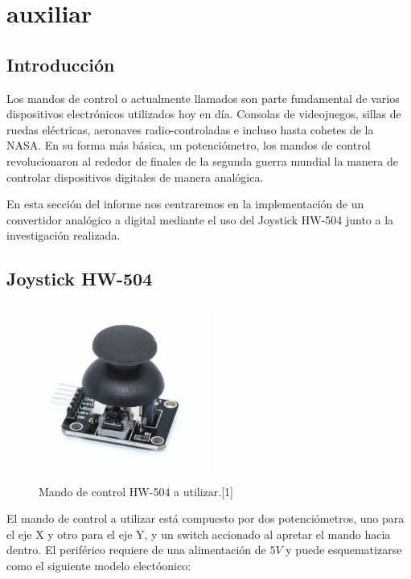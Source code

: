 

\section{auxiliar}
\tableofcontents

\subsection{Introducción}

Los mandos de control o actualmente llamados  son parte fundamental de varios dispositivos electrónicos utilizados hoy en día. Consolas de videojuegos, sillas de ruedas eléctricas, aeronaves radio-controladas e incluso hasta cohetes de la NASA. En su forma más básica, un potenciómetro, los mandos de control revolucionaron al rededor de finales de la segunda guerra mundial la manera de controlar dispositivos digitales de manera analógica. 

En esta sección del informe nos centraremos en la implementación de un convertidor analógico a digital mediante el uso del Joystick HW-504 junto a la investigación realizada.

\subsection{Joystick HW-504}

\begin{figure}[H]
	\centering
	\includegraphics[width=0.5\textwidth]{Imagenes/joystick.jpg}
	\caption{Mando de control HW-504 a utilizar.[1]}
	\label{fig:joystick}
\end{figure}

El mando de control a utilizar está compuesto por dos potenciómetros, uno para el eje X y otro para el eje Y, y un switch accionado al apretar el mando hacia dentro. El periférico requiere de una alimentación de $5V$ y puede esquematizarse como el siguiente modelo electóonico:

